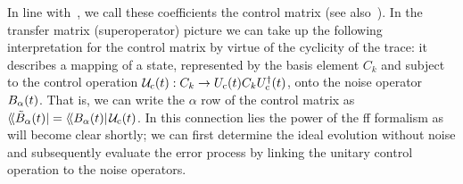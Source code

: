 In line with~\citet{Green2013}, we call these coefficients the control matrix (see also~).
In the transfer matrix (superoperator) picture we can take up the following interpretation for the control matrix by virtue of the cyclicity of the trace: it describes a mapping of a state, represented by the basis element $C_k$ and subject to the control operation $\mathcal{U}_{\mathrm{c}}(t): C_k\rightarrow U_{\mathrm{c}}(t) C_kU_{\mathrm{c}}^\dagger(t)$, onto the noise operator $B_\alpha(t)$.
That is, we can write the $\alpha$ row of the control matrix as $\langle\!\langle{\Bat(t)}\rvert = \dbra{\Ba(t)}\liouvUc(t)$.
In this connection lies the power of the \gls{ff} formalism as will become clear shortly; we can first determine the ideal evolution without noise and subsequently evaluate the error process by linking the unitary control operation to the noise operators.


